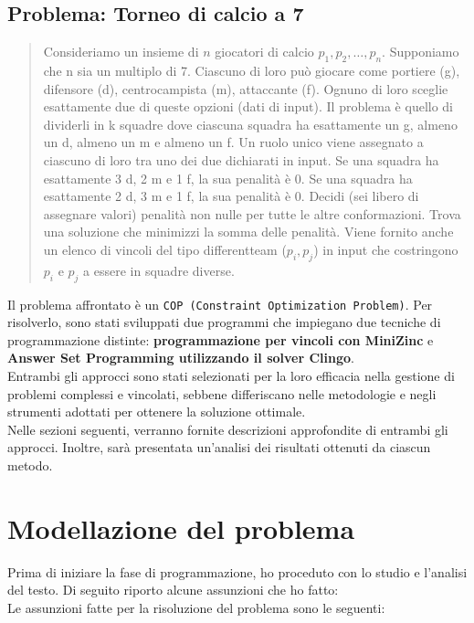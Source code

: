\documentclass{article}
\begin{document}
\begin{multicols*}{2}
\subsection{Problema: Torneo di calcio a 7}
\begin{quote}
    Consideriamo un insieme di \( n \) giocatori di calcio \( p_1, p_2, \ldots, p_n \).
    Supponiamo che n sia un multiplo di 7. 
    Ciascuno di loro può giocare come portiere (g), difensore (d), centrocampista (m), attaccante (f). 
    Ognuno di loro sceglie esattamente due di queste opzioni (dati di input).
    Il problema è quello di dividerli in k squadre dove ciascuna squadra ha esattamente un g, almeno un d, almeno un m e almeno un f. Un ruolo unico viene assegnato a ciascuno di loro tra uno dei due dichiarati in input.
    Se una squadra ha esattamente 3 d, 2 m e 1 f, la sua penalità è 0. Se una squadra ha esattamente 2 d, 3 m e 1 f, la sua penalità è 0. Decidi (sei libero di assegnare valori) penalità non nulle per tutte le altre conformazioni.
    Trova una soluzione che minimizzi la somma delle penalità.
    Viene fornito anche un elenco di vincoli del tipo differentteam (\( p_i, p_j\)) 
    in input che costringono \(p_i\) e \(p_j\) a essere in squadre diverse. 
\end{quote}
Il problema affrontato è un \texttt{COP (Constraint Optimization Problem)}.
Per risolverlo, sono stati sviluppati due programmi che impiegano due tecniche di programmazione distinte: \textbf{programmazione per vincoli con MiniZinc} e \textbf{Answer Set Programming utilizzando il solver Clingo}.
\\
Entrambi gli approcci sono stati selezionati per la loro efficacia nella gestione di problemi complessi e vincolati, sebbene differiscano nelle metodologie e negli strumenti adottati per ottenere la soluzione ottimale. 
\\
Nelle sezioni seguenti, verranno fornite descrizioni approfondite di entrambi gli approcci.
Inoltre, sarà presentata un'analisi dei risultati ottenuti da ciascun metodo. 

\section{Modellazione del problema}
Prima di iniziare la fase di programmazione, ho proceduto con lo studio e l'analisi del testo. Di seguito riporto alcune assunzioni che ho fatto:
\\
Le assunzioni fatte per la risoluzione del problema sono le seguenti:


\end{multicols*}
\end{document}
